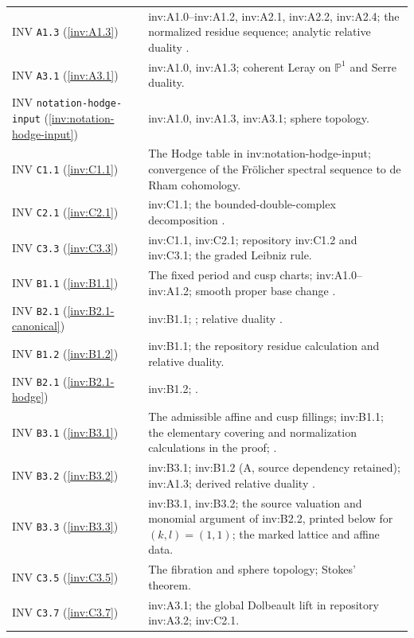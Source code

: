 \documentclass[11pt,a4paper]{article}
\theoremstyle{plain}
\theoremstyle{definition}
\begin{document}
\begin{longtable}{@{}L{.21\linewidth}L{.73\linewidth}@{}}
INV \nolinkurl{A1.3} (\ref{inv:A1.3}) & inv:A1.0--inv:A1.2, inv:A2.1, inv:A2.2, inv:A2.4; the normalized residue sequence; analytic relative duality \cite{RRV71}.\\
INV \nolinkurl{A3.1} (\ref{inv:A3.1}) & inv:A1.0, inv:A1.3; coherent Leray on $\mathbb P^1$ and Serre duality.\\
INV \nolinkurl{notation-hodge-input} (\ref{inv:notation-hodge-input}) & inv:A1.0, inv:A1.3, inv:A3.1; sphere topology.\\
INV \nolinkurl{C1.1} (\ref{inv:C1.1}) & The Hodge table in inv:notation-hodge-input; convergence of the Fr\"olicher spectral sequence to de Rham cohomology.\\
INV \nolinkurl{C2.1} (\ref{inv:C2.1}) & inv:C1.1; the bounded-double-complex decomposition \cite[Theorem 3 and Proposition 6(1)]{Stelzig21}.\\
INV \nolinkurl{C3.3} (\ref{inv:C3.3}) & inv:C1.1, inv:C2.1; repository inv:C1.2 and inv:C3.1; the graded Leibniz rule.\\
INV \nolinkurl{B1.1} (\ref{inv:B1.1}) & The fixed period and cusp charts; inv:A1.0--inv:A1.2; smooth proper base change \cite[III.4.12]{BS76}.\\
INV \nolinkurl{B2.1} (\ref{inv:B2.1-canonical}) & inv:B1.1; \cite[Theorem 1.1 and Proposition 2.3]{VL26}; relative duality \cite{RRV71}.\\
INV \nolinkurl{B1.2} (\ref{inv:B1.2}) & inv:B1.1; the repository residue calculation and relative duality.\\
INV \nolinkurl{B2.1} (\ref{inv:B2.1-hodge}) & inv:B1.2; \cite[Theorem 1.1 and Proposition 2.3]{VL26}.\\
INV \nolinkurl{B3.1} (\ref{inv:B3.1}) & The admissible affine and cusp fillings; inv:B1.1; the elementary covering and normalization calculations in the proof; \cite[III.4.12]{BS76}.\\
INV \nolinkurl{B3.2} (\ref{inv:B3.2}) & inv:B3.1; inv:B1.2 (A, source dependency retained); inv:A1.3; derived relative duality \cite{RRV71}.\\
INV \nolinkurl{B3.3} (\ref{inv:B3.3}) & inv:B3.1, inv:B3.2; the source valuation and monomial argument of inv:B2.2, printed below for $(k,l)=(1,1)$; the marked lattice and affine data.\\
INV \nolinkurl{C3.5} (\ref{inv:C3.5}) & The fibration and sphere topology; Stokes' theorem.\\
INV \nolinkurl{C3.7} (\ref{inv:C3.7}) & inv:A3.1; the global Dolbeault lift in repository inv:A3.2; inv:C2.1.\\

\end{longtable}
\end{document}
